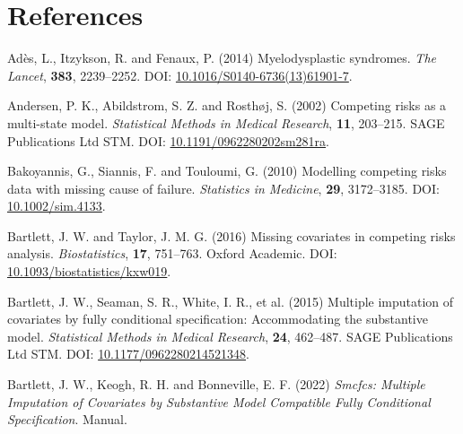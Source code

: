 \documentclass[
  letterpaper,
  DIV=11,
  numbers=noendperiod]{scrreprt}
\newlength{\cslhangindent}
\newlength{\cslentryspacingunit} %
\newenvironment{CSLReferences}[2] %
 {%
  \setlength{\parindent}{0pt}
  \ifodd #1
  \let\oldpar\par
  \def\par{\hangindent=\cslhangindent\oldpar}
  \fi
  \setlength{\parskip}{#2\cslentryspacingunit}
 }%
 {}
\begin{document}
\hypertarget{references-1}{%
\section*{References}\label{references-1}}


\hypertarget{refs-3}{}
\begin{CSLReferences}{1}{0}
\leavevmode{}%
Adès, L., Itzykson, R. and Fenaux, P. (2014) Myelodysplastic syndromes.
\emph{The Lancet}, \textbf{383}, 2239--2252. DOI:
\href{https://doi.org/10.1016/S0140-6736(13)61901-7}{10.1016/S0140-6736(13)61901-7}.

\leavevmode{}%
Andersen, P. K., Abildstrom, S. Z. and Rosthøj, S. (2002) Competing
risks as a multi-state model. \emph{Statistical Methods in Medical
Research}, \textbf{11}, 203--215. SAGE Publications Ltd STM. DOI:
\href{https://doi.org/10.1191/0962280202sm281ra}{10.1191/0962280202sm281ra}.

\leavevmode{}%
Bakoyannis, G., Siannis, F. and Touloumi, G. (2010) Modelling competing
risks data with missing cause of failure. \emph{Statistics in Medicine},
\textbf{29}, 3172--3185. DOI:
\href{https://doi.org/10.1002/sim.4133}{10.1002/sim.4133}.

\leavevmode{}%
Bartlett, J. W. and Taylor, J. M. G. (2016) Missing covariates in
competing risks analysis. \emph{Biostatistics}, \textbf{17}, 751--763.
Oxford Academic. DOI:
\href{https://doi.org/10.1093/biostatistics/kxw019}{10.1093/biostatistics/kxw019}.

\leavevmode{}%
Bartlett, J. W., Seaman, S. R., White, I. R., et al. (2015) Multiple
imputation of covariates by fully conditional specification:
{Accommodating} the substantive model. \emph{Statistical Methods in
Medical Research}, \textbf{24}, 462--487. SAGE Publications Ltd STM.
DOI:
\href{https://doi.org/10.1177/0962280214521348}{10.1177/0962280214521348}.

\leavevmode{}%
Bartlett, J. W., Keogh, R. H. and Bonneville, E. F. (2022) \emph{Smcfcs:
{Multiple} Imputation of Covariates by Substantive Model Compatible
Fully Conditional Specification}. Manual.


\end{CSLReferences}
\end{document}
